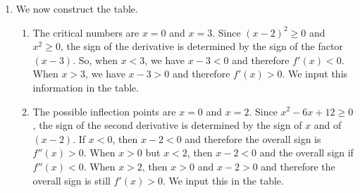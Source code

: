 \begin{enumerate}[label=\textbf{\Alph*.}]
	\item We now construct the table.
	
		\begin{enumerate}[label=\textbf{(\Roman*)}]
		\item The critical numbers are $x =0$ and $x = 3$. Since $(x - 2)^2 \geq 0$ and $x^2 \geq 0$, the sign of the derivative is determined by the sign of the factor $(x - 3)$. So, when $x < 3$, we have $x - 3 < 0$ and therefore $f'(x) < 0$. When $x > 3$, we have $x - 3 > 0$ and therefore $f'(x) > 0$. We input this information in the table.
		\item The possible inflection points are $x = 0$ and $x = 2$. Since $x^2 - 6x + 12 \geq 0$, the sign of the second derivative is determined by the sign of $x$ and of $(x - 2)$. If $x < 0$, then $x - 2 < 0$ and therefore the overall sign is $f'' (x) > 0$. When $x > 0$ but $x < 2$, then $x - 2 < 0$ and the overall sign if $f''(x) < 0$. When $x > 2$, then $x > 0$ and $x - 2 > 0$ and therefore the overall sign is still $f'(x) > 0$. We input this in the table.
	\renewcommand{\arraystretch}{1.5}
	

\end{enumerate}
\end{enumerate}
